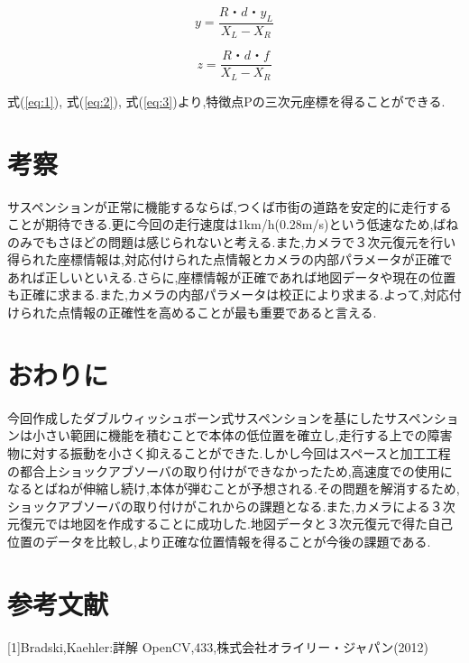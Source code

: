\documentclass[a4paper]{jarticle}
\begin{document}
\begin{equation}
 y=\frac {R・d・y_{L}}{X_{L}-X_{R}}
 \label{eq:2}
\end{equation}

\begin{equation}
 z=\frac {R・d・f}{X_{L}-X_{R}}
 \label{eq:3}
\end{equation}


式(\ref{eq:1}), 式(\ref{eq:2}), 式(\ref{eq:3})より,特徴点Pの三次元座標を得ることができる.


\section{考察}
サスペンションが正常に機能するならば,つくば市街の道路を安定的に走行することが期待できる.更に今回の走行速度は1km/h(0.28m/s)という低速なため,ばねのみでもさほどの問題は感じられないと考える.また,カメラで３次元復元を行い得られた座標情報は,対応付けられた点情報とカメラの内部パラメータが正確であれば正しいといえる.さらに,座標情報が正確であれば地図データや現在の位置も正確に求まる.また,カメラの内部パラメータは校正により求まる.よって,対応付けられた点情報の正確性を高めることが最も重要であると言える.


\section{おわりに}
今回作成したダブルウィッシュボーン式サスペンションを基にしたサスペンションは小さい範囲に機能を積むことで本体の低位置を確立し,走行する上での障害物に対する振動を小さく抑えることができた.しかし今回はスペースと加工工程の都合上ショックアブソーバの取り付けができなかったため,高速度での使用になるとばねが伸縮し続け,本体が弾むことが予想される.その問題を解消するため,ショックアブソーバの取り付けがこれからの課題となる.また,カメラによる３次元復元では地図を作成することに成功した.地図データと３次元復元で得た自己位置のデータを比較し,より正確な位置情報を得ることが今後の課題である.

\section*{参考文献}
[1]Bradski,Kaehler:詳解 OpenCV,433,株式会社オライリー・ジャパン(2012)
\end{document}
